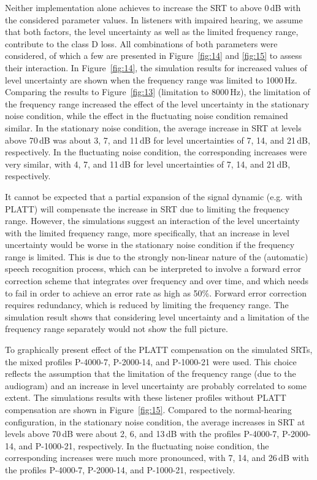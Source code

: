 \documentclass[10pt,a4paper,twocolumn]{article}
\begin{document}
Neither implementation alone achieves to increase the SRT to above 0\,dB with the considered parameter values.
%
In listeners with impaired hearing, we assume that both factors, the level uncertainty as well as the limited frequency range, contribute to the class D loss.
%
All combinations of both parameters were considered, of which a few are presented in Figure~\ref{fig:14} and \ref{fig:15} to assess their interaction.
%
In Figure~\ref{fig:14}, the simulation results for increased values of level uncertainty are shown when the frequency range was limited to 1000\,Hz.
%
Comparing the results to Figure~\ref{fig:13} (limitation to 8000\,Hz), the limitation of the frequency range increased the effect of the level uncertainty in the stationary noise condition, while the effect in the fluctuating noise condition remained similar.
%
In the stationary noise condition, the average increase in SRT at levels above 70\,dB was about 3, 7, and 11\,dB for level uncertainties of 7, 14, and 21\,dB, respectively.
%
In the fluctuating noise condition, the corresponding increases were very similar, with 4, 7, and 11\,dB for level uncertainties of 7, 14, and 21\,dB, respectively.

It cannot be expected that a partial expansion of the signal dynamic (e.g. with PLATT) will compensate the increase in SRT due to limiting the frequency range.
%
However, the simulations suggest an interaction of the level uncertainty with the limited frequency range, more specifically, that an increase in level uncertainty would be worse in the stationary noise condition if the frequency range is limited.
%
This is due to the strongly non-linear nature of the (automatic) speech recognition process, which can be interpreted to involve a forward error correction scheme that integrates over frequency and over time, and which needs to fail in order to achieve an error rate as high as 50\%.
%
Forward error correction requires redundancy, which is reduced by limiting the frequency range.
%
The simulation result shows that considering level uncertainty and a limitation of the frequency range separately would not show the full picture.

To graphically present effect of the PLATT compensation on the simulated SRTs, the mixed profiles P-4000-7, P-2000-14, and P-1000-21 were used.
%
This choice reflects the assumption that the limitation of the frequency range (due to the audiogram) and an increase in level uncertainty are probably correlated to some extent.
%
The simulations results with these listener profiles without PLATT compensation are shown in Figure~\ref{fig:15}.
%
Compared to the normal-hearing configuration, in the stationary noise condition, the average increases in SRT at levels above 70\,dB were about 2, 6, and 13\,dB with the profiles P-4000-7, P-2000-14, and P-1000-21, respectively.
%
In the fluctuating noise condition, the corresponding increases were much more pronounced, with 7, 14, and 26\,dB with the profiles P-4000-7, P-2000-14, and P-1000-21, respectively.
\end{document}
